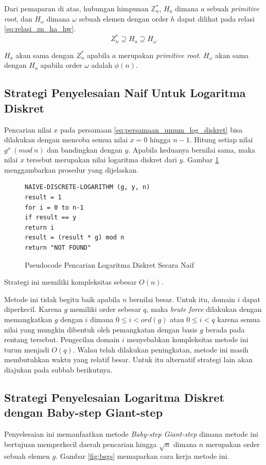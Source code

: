 Dari pemaparan di atas, hubungan himpunan $ \mathbb{Z}_n^* $, $ H_a $ dimana $ a $ sebuah \textit{primitive root}, dan $ H_{\omega} $ dimana $ \omega $ sebuah elemen dengan order $ h $ dapat dilihat pada relasi \eqref{eq:relasi_zn_ha_hw}.
\begin{equation}
Z_n^*\supseteq H_a\supseteq H_{\omega}
\label{eq:relasi_zn_ha_hw}
\end{equation}

$ H_a $ akan sama dengan $ Z_n^* $ apabila $ a $ merupakan \textit{primitive root}. $ H_{\omega} $ akan sama dengan $ H_a $ apabila order $ {\omega} $ adalah $ \phi(n) $.

\subsection{Strategi Penyelesaian Naif Untuk Logaritma Diskret}
Pencarian nilai $ x $ pada persamaan \eqref{eq:persamaan_umum_log_diskret} bisa dilakukan dengan mencoba semua nilai $ x = 0 $ hingga $ n-1 $. Hitung setiap nilai $ g^x\ (mod\ n) $ dan bandingkan dengan $ y $. Apabila keduanya bernilai sama, maka nilai $ x $ tersebut merupakan nilai logaritma diskret dari $ y $. Gambar \ref{psdo:disc_log_naive} menggambarkan prosedur yang dijelaskan.
\begin{figure}[h!]
\begin{lstlisting}[firstnumber=0]
NAIVE-DISCRETE-LOGARITHM (g, y, n)
result = 1
for i = 0 to n-1
if result == y
return i
result = (result * g) mod n
return "NOT FOUND"
\end{lstlisting}
\caption{Pseudocode Pencarian Logaritma Diskret Secara Naif}
\label{psdo:disc_log_naive}
\end{figure}
Strategi ini memiliki kompleksitas sebesar $ O(n) $.

Metode ini tidak begitu baik apabila $ n $ bernilai besar. Untuk itu, domain $ i $ dapat diperkecil. Karena $ g $ memiliki order sebesar $ q $, maka \textit{brute force} dilakukan dengan memangkatkan $ g $ dengan $ i $ dimana $ 0\leq i < ord(g) $ atau $ 0 \leq i < q $ karena semua nilai yang mungkin dibentuk oleh pemangkatan dengan basis $ g $ berada pada rentang tersebut. Pengecilan domain $ i $ menyebabkan kompleksitas metode ini turun menjadi $ O(q) $. Walau telah dilakukan peningkatan, metode ini masih membutuhkan waktu yang relatif besar. Untuk itu alternatif strategi lain akan diajukan pada subbab berikutnya.

\subsection {Strategi Penyelesaian Logaritma Diskret dengan Baby-step Giant-step}
Penyelesaian ini memanfaatkan metode \textit{Baby-step Giant-step} dimana metode ini bertujuan memperkecil daerah pencarian hingga $ \sqrt{n} $ dimana $ n $ merupakan order sebuah elemen $ g $. Gambar \ref{fig:bsgs} memaparkan cara kerja metode ini.

